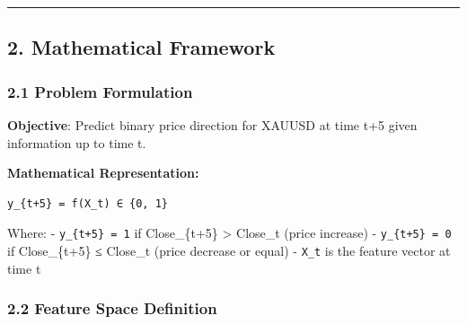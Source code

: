 \begin{Shaded}
\begin{Highlighting}[]



\end{Highlighting}
\end{Shaded}

\begin{center}\rule{0.5\linewidth}{0.5pt}\end{center}

\subsection{2. Mathematical Framework}\label{mathematical-framework}

\subsubsection{2.1 Problem Formulation}\label{problem-formulation}

\textbf{Objective}: Predict binary price direction for XAUUSD at time
t+5 given information up to time t.

\textbf{Mathematical Representation:}

\begin{verbatim}
y_{t+5} = f(X_t) ∈ {0, 1}
\end{verbatim}

Where: - \texttt{y\_\{t+5\}\ =\ 1} if Close\_\{t+5\} \textgreater{}
Close\_t (price increase) - \texttt{y\_\{t+5\}\ =\ 0} if Close\_\{t+5\}
≤ Close\_t (price decrease or equal) - \texttt{X\_t} is the feature
vector at time t

\subsubsection{2.2 Feature Space
Definition}\label{feature-space-definition}

